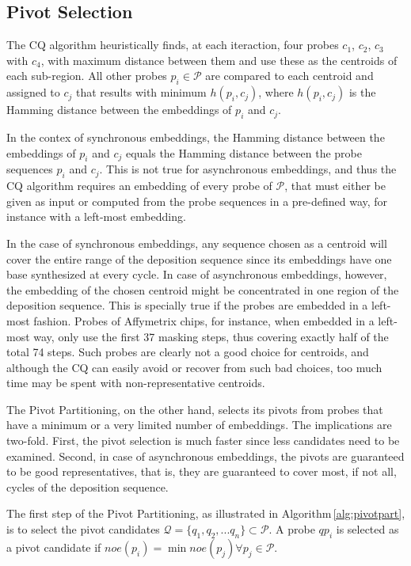 \documentclass{llncs}
\begin{document}
\subsection{Pivot Selection}

The CQ algorithm heuristically finds, at each iteraction, four probes $c_1$, $c_2$,
$c_3$ with $c_4$, with maximum
distance between them and use these as the centroids of each sub-region. All
other probes $p_i \in \mathcal{P}$ are compared to each centroid and assigned to $c_j$
that results with minimum $h(p_i, c_j)$, where $h(p_i, c_j)$ is the Hamming distance
between the embeddings of $p_i$ and $c_j$.

In the contex of synchronous embeddings, the Hamming distance between the embeddings
of $p_i$ and $c_j$ equals the Hamming distance between the probe sequences $p_i$ and $c_j$.
This is not true for asynchronous embeddings, and thus the CQ algorithm requires an
embedding of every probe of $\mathcal{P}$, that must either be given as input or computed
from the probe sequences in a pre-defined way, for instance with a left-most embedding.

In the case of synchronous embeddings, any sequence chosen as a centroid will cover the
entire range of
the deposition sequence since its embeddings have one base synthesized at every cycle. In
case of asynchronous embeddings, however, the embedding of the chosen centroid might be
concentrated in one region of the deposition sequence. This is specially true if the probes
are embedded in a left-most fashion. Probes of Affymetrix chips, for instance, when embedded
in a left-most way, only use the first 37 masking steps, thus covering exactly half of the
total 74 steps. Such probes are clearly not a good choice for centroids, and although the CQ
can easily avoid or recover from such bad choices, too much time may be spent with
non-representative centroids.

The Pivot Partitioning, on the other hand, selects its pivots from probes that have a
minimum or a very limited number of embeddings. The implications are two-fold. First, the
pivot selection is much faster since less candidates need to be examined. Second, in case of
asynchronous embeddings, the pivots are guaranteed to be good representatives, that is, they
are guaranteed to cover most, if not all, cycles of the deposition sequence.

The first step of the Pivot Partitioning, as illustrated in Algorithm\,\ref{alg:pivotpart},
is to select the pivot candidates
$\mathcal{Q} = \{q_{1}, q_{2}, ... q_{n}\} \subset \mathcal{P}$.
A probe $qp_i$ is selected as a pivot candidate if
$noe(p_i) = \min noe(p_j) \forall p_j \in \mathcal{P}$.
\end{document}
